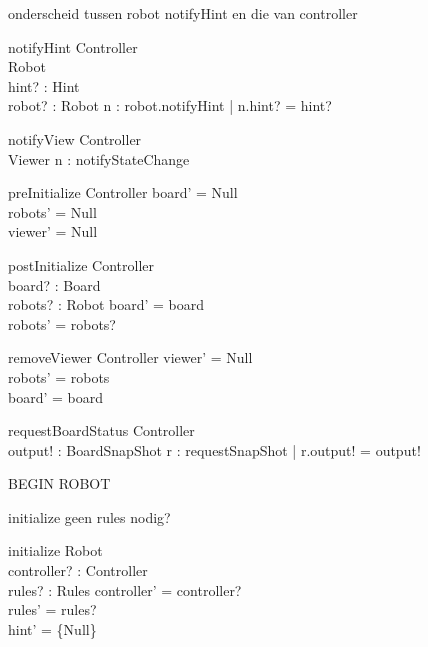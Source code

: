 \documentclass[a4paper,11pt]{article}
\begin{document}
onderscheid tussen robot notifyHint en die van controller
\begin{schema}{notifyHint}
\Xi Controller \\
\Delta Robot \\
hint? : Hint \\
robot? : Robot
\where
\exists n : robot.notifyHint | n.hint? = hint?
\end{schema}

\begin{schema}{notifyView}
\Xi Controller \\
\Delta Viewer
\where
\exists n : notifyStateChange
\end{schema}

\begin{schema}{preInitialize}
\Delta Controller
\where
board' = Null \\
robots' = Null \\
viewer' = Null
\end{schema}

\begin{schema}{postInitialize}
\Delta Controller \\
board? : Board \\
robots? : \power Robot 
\where
board' = board \\
robots' = robots?
\end{schema}

\begin{schema}{removeViewer}
\Delta Controller 
\where
viewer' = Null \\
robots' = robots \\
board' = board
\end{schema}

\begin{schema}{requestBoardStatus}
\Xi Controller \\
output! : BoardSnapShot
\where
\exists r : requestSnapShot | r.output! = output!
\end{schema}


BEGIN ROBOT

initialize geen rules nodig?
\begin{schema}{initialize}
\Delta Robot \\
controller? : Controller \\
rules? : Rules
\where
controller' = controller? \\
rules' = rules? \\
hint' = \{Null\}
\end{schema}
\end{document}
